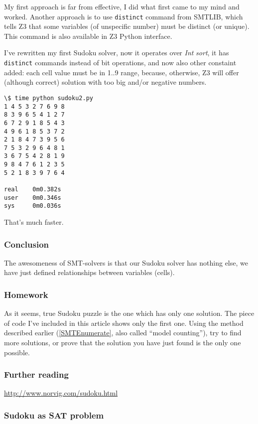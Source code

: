 My first approach is far from effective, I did what first came to my mind and worked.
Another approach is to use \texttt{distinct} command from SMTLIB, which tells Z3 that some variables (of unspecific number) must be distinct (or unique).
This command is also available in Z3 Python interface.

I've rewritten my first Sudoku solver, now it operates over \textit{Int} \textit{sort}, it has \texttt{distinct} commands instead of bit operations,
and now also other constaint added: each cell value must be in 1..9 range, because, otherwise, Z3 will offer (although correct) solution with too big
and/or negative numbers.



\begin{lstlisting}
\$ time python sudoku2.py
1 4 5 3 2 7 6 9 8
8 3 9 6 5 4 1 2 7
6 7 2 9 1 8 5 4 3
4 9 6 1 8 5 3 7 2
2 1 8 4 7 3 9 5 6
7 5 3 2 9 6 4 8 1
3 6 7 5 4 2 8 1 9
9 8 4 7 6 1 2 3 5
5 2 1 8 3 9 7 6 4

real    0m0.382s
user    0m0.346s
sys     0m0.036s
\end{lstlisting}

That's much faster.

\subsubsection{Conclusion}

The awesomeness of SMT-solvers is that our Sudoku solver has nothing else, we have just defined relationships between variables (cells).

\subsubsection{Homework}

As it seems, true Sudoku puzzle is the one which has only one solution.
The piece of code I've included in this article shows only the first one.
Using the method described earlier (\ref{SMTEnumerate}, also called ``model counting''), 
try to find more solutions, or prove that the solution you have just found is the only one possible.

\subsubsection{Further reading}

\url{http://www.norvig.com/sudoku.html}

\subsubsection{Sudoku as SAT problem}

